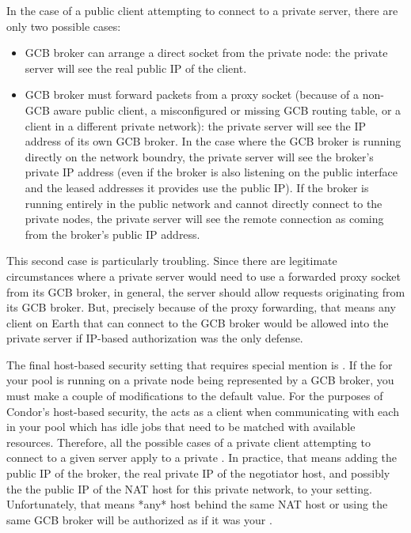 In the case of a public client attempting to connect to a private
server, there are only two possible cases:

\begin{itemize}

  \item GCB broker can arrange a direct socket from the private node:
  the private server will see the real public IP of the client.

  \item GCB broker must forward packets from a proxy socket (because
  of a non-GCB aware public client, a misconfigured or missing GCB
  routing table, or a client in a different private network): the
  private server will see the IP address of its own GCB broker.
  In the case where the GCB broker is running directly on the network
  boundry, the private server will see the broker's private IP
  address (even if the broker is also listening on the public
  interface and the leased addresses it provides use the public IP). 
  If the broker is running entirely in the public network and cannot
  directly connect to the private nodes, the private server will see
  the remote connection as coming from the broker's public IP
  address.

\end{itemize}

This second case is particularly troubling.
Since there are legitimate circumstances where a private server would
need to use a forwarded proxy socket from its GCB broker, in general,
the server should allow requests originating from its GCB broker.
But, precisely because of the proxy forwarding, that means any client
on Earth that can connect to the GCB broker would be allowed into the
private server if IP-based authorization was the only defense.

The final host-based security setting that requires special mention is
.
If the  for your pool is running on a private node
being represented by a GCB broker, you must make a couple of
modifications to the default value.
For the purposes of Condor's host-based security, the
 acts as a client when communicating with each 
 in your pool which has idle jobs that need to be
matched with available resources.
Therefore, all the possible cases of a private client attempting to
connect to a given server apply to a private .
In practice, that means adding the public IP of the broker, the real
private IP of the negotiator host, and possibly the the public IP of
the NAT host for this private network, to your
 setting.
Unfortunately, that means *any* host behind the same NAT host or using
the same GCB broker will be authorized as if it was your
. 

